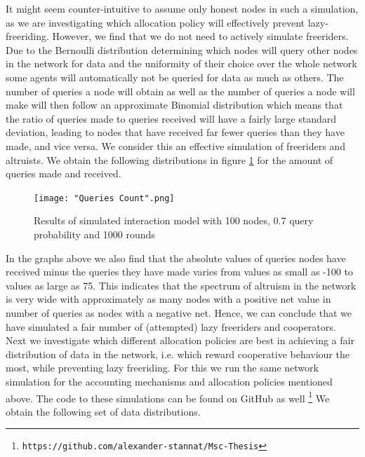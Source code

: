 \noindent{}It might seem counter-intuitive to assume only honest nodes in such a simulation, as we are investigating which allocation policy will effectively prevent lazy-freeriding. However, we find that we do not need to actively simulate freeriders. Due to the Bernoulli distribution determining which nodes will query other nodes in the network for data and the uniformity of their choice over the whole network some agents will automatically not be queried for data as much as others. The number of queries a node will obtain as well as the number of queries a node will make will then follow an approximate Binomial distribution which means that the ratio of queries made to queries received will have a fairly large standard deviation, leading to nodes that have received far fewer queries than they have made, and vice versa. We consider this an effective simulation of freeriders and altruists. We obtain the following distributions in figure \ref{fig:Queries Count} for the amount of queries made and received.\vspace{1em}\\

\begin{figure}[H]
\begin{center}
\texttt{[image: "Queries Count".png]}
\caption{Results of simulated interaction model with 100 nodes, 0.7 query probability and 1000 rounds}
\label{fig:Queries Count}
\end{center}
\end{figure}


\noindent{}In the graphs above we also find that the absolute values of queries nodes have received minus the queries they have made varies from values as small as -100 to values as large as 75. This indicates that the spectrum of altruism in the network is very wide with approximately as many nodes with a positive net value in number of queries as nodes with a negative net. Hence, we can conclude that we have simulated a fair number of (attempted) lazy freeriders and cooperators. \vspace{1em}\\

\noindent{}Next we investigate which different allocation policies are best in achieving a fair distribution of data in the network, i.e. which reward cooperative behaviour the most, while preventing lazy freeriding. For this we run the same network simulation for the accounting mechanisms and allocation policies mentioned above. The code to these simulations can be found on GitHub as well \footnote{\texttt{https://github.com/alexander-stannat/Msc-Thesis}} We obtain the following set of data distributions.


